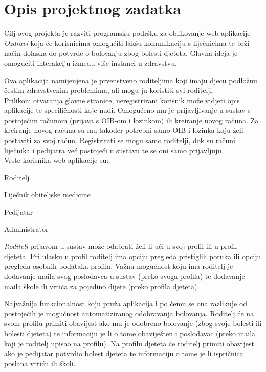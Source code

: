 \chapter{Opis projektnog zadatka}
				
		Cilj ovog projekta je razviti programsku podršku za oblikovanje web aplikacije \textit{Ozdravi} koja će korisnicima omogućiti lakšu komunikaciju s liječnicima te brži način dolaska do potvrde o bolovanju zbog bolesti djeteta. Glavna ideja je omogućiti interakciju između više instanci u zdravstvu.
		
		Ova aplikacija namijenjena je prvenstveno roditeljima koji imaju djecu podložnu čestim zdravstvenim problemima, ali mogu ju koristiti svi roditelji.\\
		
		Prilikom otvaranja glavne stranice, neregistrirani korisnik može vidjeti opis aplikacije te specifičnosti koje nudi. Omogućeno mu je prijavljivanje u sustav s postojećim računom (prijava s OIB-om i lozinkom) ili kreiranje novog računa. Za kreiranje novog računa su mu također potrebni samo OIB i lozinka koju želi postaviti za svoj račun. Registrirati se mogu samo roditelji, dok su računi liječnika i pedijatra već postojeći u sustavu te se oni samo prijavljuju.\\
		
		Vrste korisnika web aplikacije su:
		\begin{packed_item}
			\item Roditelj
			\item Liječnik obiteljske medicine
			\item Pedijatar
			\item Administrator
			
		\end{packed_item}
		
		
		\textit{Roditelj} prijavom u sustav može odabrati želi li ući u svoj profil ili u profil djeteta. Pri ulasku u profil roditelj ima opciju pregleda pristiglih poruka ili opciju pregleda osobnih podataka profila. Važnu mogućnost koju ima roditelj je dodavanje maila svog poslodavca u sustav (preko svoga profila) te dodavanje maila škole ili vrtića za pojedino dijete (preko profila djeteta). 
		
		Najvažnija funkcionalnost koju pruža aplikacija i po čemu se ona razlikuje od postojećih je mogućnost automatiziranog odobravanja bolovanja. Roditelj će na svom profilu primiti obavijest ako mu je odobreno bolovanje (zbog svoje bolesti ili bolesti djeteta) te informaciju je li o tome obaviješten i poslodavac (preko maila koji je roditelj upisao na profilu). Na profilu djeteta će roditelj primiti obavijest ako je pedijatar potvrdio bolest djeteta te informaciju o tome je li ispričnica poslana vrtiću ili školi.
		

